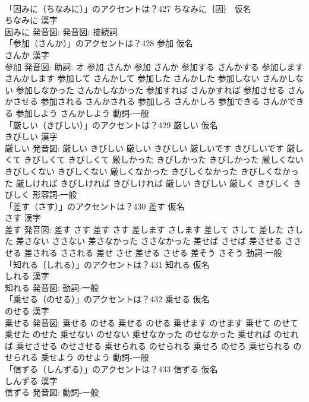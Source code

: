 \documentclass[8pt]{extreport}
\begin{document}
\begin{CJK}{UTF8}{min}
\\	「因みに（ちなみに）」のアクセントは？427	ちなみに｛因｝ 仮名　
\\	ちなみに 漢字　
\\	因みに 発音図: 発音図:							接続詞 
\\	「参加（さんか）」のアクセントは？428	参加 仮名　
\\	さんか 漢字　
\\	参加 発音図: 助詞: オ	参加 さんか		参加 さんか 参加する さんかする 参加します さんかします 参加して さんかして 参加した さんかした 参加しない さんかしない 参加しなかった さんかしなかった 参加すれば さんかすれば 参加させる さんかさせる 参加される さんかされる 参加しろ さんかしろ 参加できる さんかできる 参加しよう さんかしよう				動詞-一般 
\\	「厳しい（きびしい）」のアクセントは？429	厳しい 仮名　
\\	きびしい 漢字　
\\	厳しい 発音図:	厳しい きびしい		厳しい きびしい 厳しいです きびしいです 厳しくて きびしくて きびしくて 厳しかった きびしかった きびしかった 厳しくない きびしくない きびしくない 厳しくなかった きびしくなかった きびしくなかった 厳しければ きびしければ きびしければ 厳しい きびしい 厳しく きびしく きびしく				形容詞-一般 
\\	「差す（さす）」のアクセントは？430	差す 仮名　
\\	さす 漢字　
\\	差す 発音図:	差す さす		差す さす 差します さします 差して さして 差した さした 差さない ささない 差さなかった ささなかった 差せば させば 差させる ささせる 差される さされる 差せ させ 差せる させる 差そう さそう				動詞-一般 
\\	「知れる（しれる）」のアクセントは？431	知れる 仮名　
\\	しれる 漢字　
\\	知れる 発音図:							動詞-一般 
\\	「乗せる（のせる）」のアクセントは？432	乗せる 仮名　
\\	のせる 漢字　
\\	乗せる 発音図:	乗せる のせる		乗せる のせる 乗せます のせます 乗せて のせて 乗せた のせた 乗せない のせない 乗せなかった のせなかった 乗せれば のせれば 乗せさせる のせさせる 乗せられる のせられる 乗せろ のせろ 乗せられる のせられる 乗せよう のせよう				動詞-一般 
\\	「信ずる（しんずる）」のアクセントは？433	信ずる 仮名　
\\	しんずる 漢字　
\\	信ずる 発音図:							動詞-一般 

\end{CJK}
\end{document}
